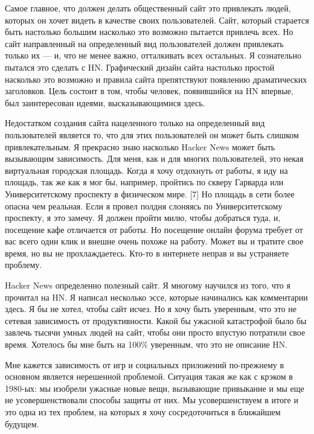 \documentclass[ebook,12pt,oneside,openany]{memoir}
\begin{document}
Самое главное, что должен делать общественный сайт это привлекать
людей, которых он хочет видеть в качестве своих пользователей. Сайт,
который старается быть настолько большим насколько это возможно
пытается привлечь всех. Но сайт направленный на определенный вид
пользователей должен привлекать только их — и, что не менее важно,
отталкивать всех остальных. Я сознательно пытался это сделать с HN.
Графический дизайн сайта настолько простой насколько это возможно и
правила сайта препятствуют появлению драматических заголовков. Цель
состоит в том, чтобы человек, появившийся на HN впервые, был
заинтересован идеями, высказывающимися здесь. \newline

Недостатком создания сайта нацеленного только на определенный вид
пользователей является то, что для этих пользователей он может быть
слишком привлекательным. Я прекрасно знаю насколько Hacker News может
быть вызывающим зависимость. Для меня, как и для многих пользователей,
это некая виртуальная городская площадь. Когда я хочу отдохнуть от
работы, я иду на площадь, так же как я мог бы, например, пройтись по
скверу Гарварда или Университетскому проспекту в физическом мире. [7]
Но площадь в сети более опасна чем реальная. Если я провел полдня
слоняясь по Университетскому проспекту, я это замечу. Я должен пройти
милю, чтобы добраться туда, и, посещение кафе отличается от работы. Но
посещение онлайн форума требует от вас всего один клик и внешне очень
похоже на работу. Может вы и тратите свое время, но вы не
прохлаждаетесь. Кто-то в интернете неправ и вы устраняете проблему. \newline

Hacker News определенно полезный сайт. Я многому научился из того, что
я прочитал на HN. Я написал несколько эссе, которые начинались как
комментарии здесь. Я бы не хотел, чтобы сайт исчез. Но я хочу быть
уверенным, что это не сетевая зависимость от продуктивности. Какой бы
ужасной катастрофой было бы завлечь тысячи умных людей на сайт, чтобы
они просто впустую потратили свое время. Хотелось бы мне быть на 100\%
уверенным, что это не описание HN. \newline

Мне кажется зависимость от игр и социальных приложений по-прежнему в
основном является нерешенной проблемой. Ситуация такая же как с крэком
в 1980-ых: мы изобрели ужасные новые вещи, вызывающие привыкание и мы
еще не усовершенствовали способы защиты от них. Мы усовершенствуем в
итоге и это одна из тех проблем, на которых я хочу сосредоточиться в
ближайшем будущем. \newline
\end{document}
